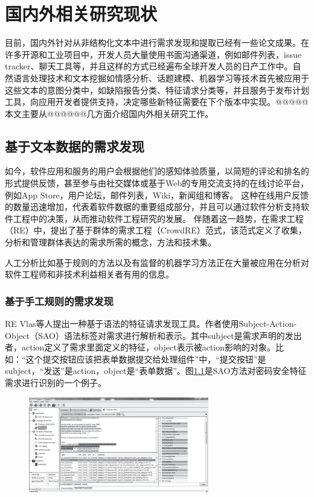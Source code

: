 \chapter{国内外相关研究现状}\label{chap:related_work}

目前，国内外针对从非结构化文本中进行需求发现和提取已经有一些论文成果。在许多开源和工业项目中，开发人员大量使用书面沟通渠道，例如邮件列表，issue tracker、聊天工具等，并且这样的方式已经遍布全球开发人员的日产工作中。自然语言处理技术和文本挖掘如情感分析、话题建模、机器学习等技术首先被应用于这些文本的意图分类中，如缺陷报告分类、特征请求分类等\cite{maalej2015bug}，并且服务于发布计划工具，向应用开发者提供支持，决定哪些新特征需要在下个版本中实现。@@@@@本文主要从@@@@@@几方面介绍国内外相关研究工作。

\section{基于文本数据的需求发现}
如今，软件应用和服务的用户会根据他们的感知体验质量，以简短的评论和排名的形式提供反馈，甚至参与由社交媒体或基于Web的专用交流支持的在线讨论平台，例如App Store，用户论坛，邮件列表，Wiki，新闻组和博客。 这种在线用户反馈的数量迅速增加，代表着软件数据的重要组成部分，并且可以通过软件分析支持软件工程中的决策，从而推动软件工程研究的发展\cite{Morales2019Speech}。 
伴随着这一趋势，在需求工程（RE）中，提出了基于群体的需求工程（CrowdRE）\cite{groen2017crowd}范式，该范式定义了收集，分析和管理群体表达的需求所需的概念，方法和技术集。

人工分析比如基于规则的方法以及有监督的机器学习方法正在大量被应用在分析对软件工程师和非技术利益相关者有用的信息\cite{Morales2019Speech}。
\subsection{基于手工规则的需求发现}

RE Vlas等人\cite{morales2014discovering}提出一种基于语法的特征请求发现工具。作者使用Subject-Action-Object（SAO）语法标签对需求进行解析和表示。其中subject是需求声明的发出者，action定义了需求里面定义的特征，object表示被action影响的对象。比如：“这个提交按钮应该把表单数据提交给处理组件”中，“提交按钮”是subject，“发送”是action，object是“表单数据”。图\ref{fig:sao}是SAO方法对密码安全特征需求进行识别的一个例子。
\begin{figure}[htbp]
    \centering
    \includegraphics[width=0.70\textwidth]{Img/sao.png}
    \label{fig:sao}
\end{figure}


